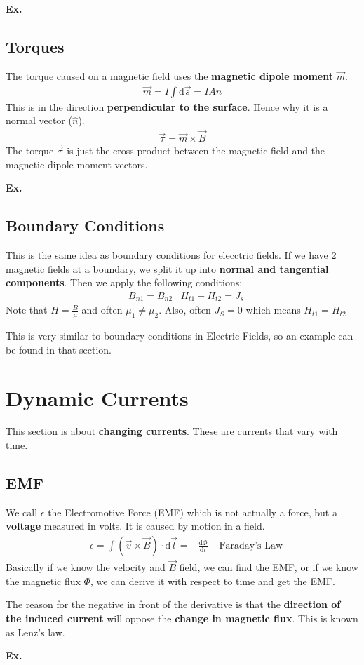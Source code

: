 \documentclass[12pt,letterpaper]{article} \usepackage{amsmath} \usepackage{graphicx} \usepackage[margin=1in]{geometry} \usepackage{longtable}  \usepackage{amssymb}
\begin{document}
	\begin{mdframed}
		\textbf{Ex. }
	\end{mdframed}
	
	\subsection{Torques}
	The torque caused on a magnetic field uses the \textbf{magnetic dipole moment} $\vec m$.
	\begin{align*}
		\vec m = I\int \mathrm d \vec s = IA\hat n
	\end{align*}
	This is in the direction \textbf{perpendicular to the surface}. Hence why it is a normal vector ($\hat n$).
	\begin{align*}
		\vec \tau = \vec m \times \vec B
	\end{align*}
	The torque $\vec \tau$ is just the cross product between the magnetic field and the magnetic dipole moment vectors.
	
	\begin{mdframed}
		\textbf{Ex. }
	\end{mdframed}
	
	\subsection{Boundary Conditions}
	This is the same idea as boundary conditions for elecctric fields. If we have 2 magnetic fields at a boundary, we split it up into \textbf{normal and tangential components}. Then we apply the following conditions:
	\begin{align*}
		&B_{n1} = B_{n2} &H_{t1} - H_{t2} = J_s
	\end{align*}
	Note that $H = \frac{B}{\mu}$ and often $\mu_1 \ne \mu_2$. Also, often $J_S=0$ which means $H_{t1} = H_{t2}$
	
	\begin{mdframed}
		This is very similar to boundary conditions in Electric Fields, so an example can be found in that section.
	\end{mdframed}
	
	\section{Dynamic Currents}
	This section is about \textbf{changing currents}. These are currents that vary with time. 
	
	\subsection{EMF}
	We call $\epsilon$ the Electromotive Force (EMF) which is not actually a force, but a \textbf{voltage} measured in volts. It is caused by motion in a field. 
	\begin{align*}
		&\epsilon = \int(\vec v \times \vec B)\cdot \mathrm d \vec l = -\frac{\mathrm d \Phi}{\mathrm d t} &\text{ Faraday's Law}
	\end{align*}
	Basically if we know the velocity and $\vec B$ field, we can find the EMF, or if we know the magnetic flux $\Phi$, we can derive it with respect to time and get the EMF. 
	
	The reason for the negative in front of the derivative is that the \textbf{direction of the induced current} will oppose the \textbf{change in magnetic flux}. This is known as Lenz's law.
	
	\begin{mdframed}
		\textbf{Ex. }
	\end{mdframed}
	
	
\end{document}
